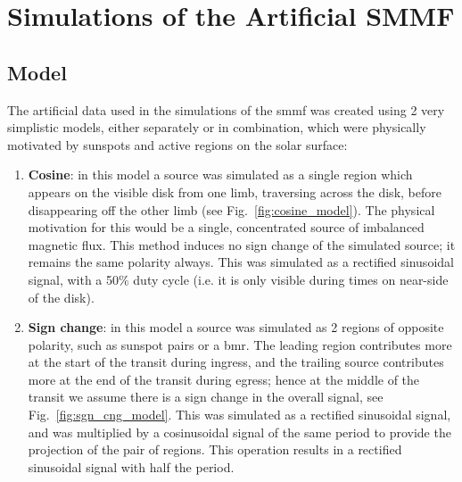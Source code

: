 \chapter{Simulations of the Artificial SMMF}\label{app:SMMF_sims}


\section{Model}

The artificial data used in the simulations of the \gls{smmf} was created using 2 very simplistic models, either separately or in combination, which were physically motivated by sunspots and active regions on the solar surface:

\begin{enumerate}
	
	\item{{\bf Cosine}: in this model a source was simulated as a single region which appears on the visible disk from one limb, traversing across the disk, before disappearing off the other limb (see Fig.~\ref{fig:cosine_model}). The physical motivation for this would be a single, concentrated source of imbalanced magnetic flux. This method induces no sign change of the simulated source; it remains the same polarity always. This was simulated as a rectified sinusoidal signal, with a 50$\%$ duty cycle (i.e. it is only visible during times on near-side of the disk).}
	
	\item{{\bf Sign change}: in this model a source was simulated as 2 regions of opposite polarity, such as sunspot pairs or a \gls{bmr}. The leading region contributes more at the start of the transit during ingress, and the trailing source contributes more at the end of the transit during egress; hence at the middle of the transit we assume there is a sign change in the overall signal, see Fig.~\ref{fig:sgn_cng_model}. This was simulated as a rectified sinusoidal signal, and was multiplied by a cosinusoidal signal of the same period to provide the projection of the pair of regions. This operation results in a rectified sinusoidal signal with half the period.}
	
\end{enumerate}

